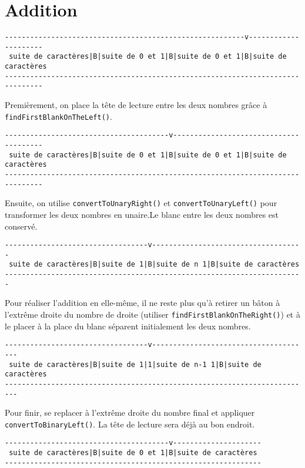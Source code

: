 \documentclass[a4paper,11pt]{article}
\begin{document}
\section{Addition}\label{add}
\begin{verbatim}
---------------------------------------------------------v---------------------
 suite de caractères|B|suite de 0 et 1|B|suite de 0 et 1|B|suite de caractères
-------------------------------------------------------------------------------
\end{verbatim}
Premièrement, on place la tête de lecture entre les deux nombres grâce à \texttt{findFirstBlankOnTheLeft()}.
\begin{verbatim}
---------------------------------------v---------------------------------------
 suite de caractères|B|suite de 0 et 1|B|suite de 0 et 1|B|suite de caractères
-------------------------------------------------------------------------------
\end{verbatim}
Ensuite, on utilise \texttt{convertToUnaryRight()} et \texttt{convertToUnaryLeft()} pour transformer les deux nombres en unaire.Le blanc entre les deux nombres est conservé.
\begin{verbatim}
----------------------------------v------------------------------------
 suite de caractères|B|suite de 1|B|suite de n 1|B|suite de caractères
-----------------------------------------------------------------------
\end{verbatim}
Pour réaliser l'addition en elle-même, il ne reste plus qu'à retirer un bâton à l'extrême droite du nombre de droite (utiliser \texttt{findFirstBlankOnTheRight()}) et à le placer à la place du blanc séparent initialement les deux nombres.
\begin{verbatim}
----------------------------------v--------------------------------------
 suite de caractères|B|suite de 1|1|suite de n-1 1|B|suite de caractères
-------------------------------------------------------------------------
\end{verbatim}
Pour finir, se replacer à l'extrême droite du nombre final et appliquer \texttt{convertToBinaryLeft()}. La tête de lecture sera déjà au bon endroit.
\begin{verbatim}
---------------------------------------v---------------------
 suite de caractères|B|suite de 0 et 1|B|suite de caractères
-------------------------------------------------------------
\end{verbatim}
\end{document}
